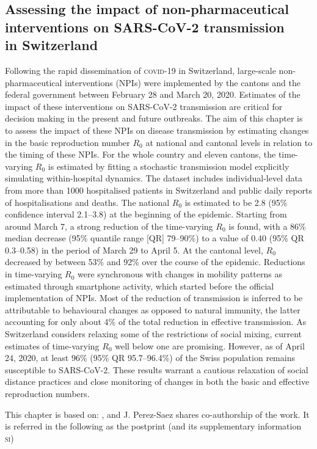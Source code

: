 \begin{fullwidth}
\chapter[Assessing the impact of non-pharmaceutical interventions on SARS-CoV-2 transmission in Switzerland]{Assessing the impact of non-pharmaceutical\\ interventions on SARS-CoV-2 transmission\\ in Switzerland}
\label{ch:covid-switzerland-npi}

Following the rapid dissemination of \textsc{covid}-19 in Switzerland, large-scale non-pharmaceutical interventions (NPIs) were implemented by the cantons and the federal government between February 28 and March 20, 2020. Estimates of the impact of these interventions on SARS-CoV-2 transmission are critical for decision making in the present and future outbreaks. The aim of this chapter is to assess the impact of these NPIs on disease transmission by estimating changes in the basic reproduction number $R_0$ at national and cantonal levels in relation to the timing of these NPIs. For the whole country and eleven cantons, the time-varying $R_0$ is estimated by fitting a stochastic transmission model explicitly simulating within-hospital dynamics. The dataset includes individual-level data from more than 1000 hospitalised patients in Switzerland and public daily reports of hospitalisations and deaths. The national $R_0$ is estimated to be 2.8 (95\% confidence interval 2.1–3.8) at the beginning of the epidemic. Starting from around March 7, a strong reduction of the time-varying $R_0$ is found, with a 86\% median decrease (95\% quantile range [QR] 79–90\%) to a value of 0.40 (95\% QR 0.3–0.58) in the period of March 29 to April 5. At the cantonal level, $R_0$ decreased by between 53\% and 92\% over the course of the epidemic. Reductions in time-varying $R_0$ were synchronous with changes in mobility patterns as estimated through smartphone activity, which started before the official implementation of NPIs. Most of the reduction of transmission is inferred to be attributable to behavioural changes as opposed to natural immunity, the latter accounting for only about 4\% of the total reduction in effective transmission. As Switzerland considers relaxing some of the restrictions of social mixing, current estimates of time-varying $R_0$ well below one are promising. However, as of April 24, 2020, at least 96\% (95\% QR 95.7–96.4\%) of the Swiss population remains susceptible to SARS-CoV-2. These results warrant a cautious relaxation of social distance practices and close monitoring of changes in both the basic and effective reproduction numbers.

This chapter is based on:
, and J. Perez-Saez shares co-authorship of the work. It  is referred in the following as the postprint (and its supplementary information \textsc{si})
\end{fullwidth}

